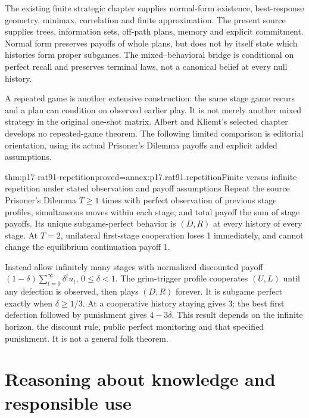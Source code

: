 The existing finite strategic chapter supplies normal-form existence,
best-response geometry, minimax, correlation and finite approximation.
The present source supplies trees, information sets, off-path plans,
memory and explicit commitment. Normal form preserves payoffs of whole
plans, but does not by itself state which histories form proper subgames.
The mixed--behavioral bridge is conditional on perfect recall and
preserves terminal laws, not a canonical belief at every null history.

A repeated game is another extensive construction: the same stage
game recurs and a plan can condition on observed earlier play. It is
not merely another mixed strategy in the original one-shot matrix.
Albert and Kliemt's selected chapter develops no repeated-game theorem.
The following limited comparison is editorial orientation, using its
actual Prisoner's Dilemma payoffs and explicit added assumptions.

\begin{hbtheorem}{thm:p17-rat91-repetition}{proved=annex:p17.rat91.repetition}{Finite versus infinite repetition under stated observation and payoff assumptions}
Repeat the source Prisoner's Dilemma \(T\geq1\) times with perfect
observation of previous stage profiles, simultaneous moves within
each stage, and total payoff the sum of stage payoffs. Its unique
subgame-perfect behavior is \((D,R)\) at every history of every stage.
At \(T=2\), unilateral first-stage cooperation loses 1 immediately,
and cannot change the equilibrium continuation payoff 1.

Instead allow infinitely many stages with normalized discounted
payoff \((1-\delta)\sum_{t=0}^{\infty}\delta^t u_t\),
\(0\leq\delta<1\). The grim-trigger profile cooperates \((U,L)\)
until any defection is observed, then plays \((D,R)\) forever.
It is subgame perfect exactly when \(\delta\geq1/3\).
At a cooperative history staying gives 3; the best first defection
followed by punishment gives \(4-3\delta\). This result depends
on the infinite horizon, the discount rule, public perfect monitoring
and that specified punishment. It is not a general folk theorem.
\end{hbtheorem}

\section{Reasoning about knowledge and responsible use}

